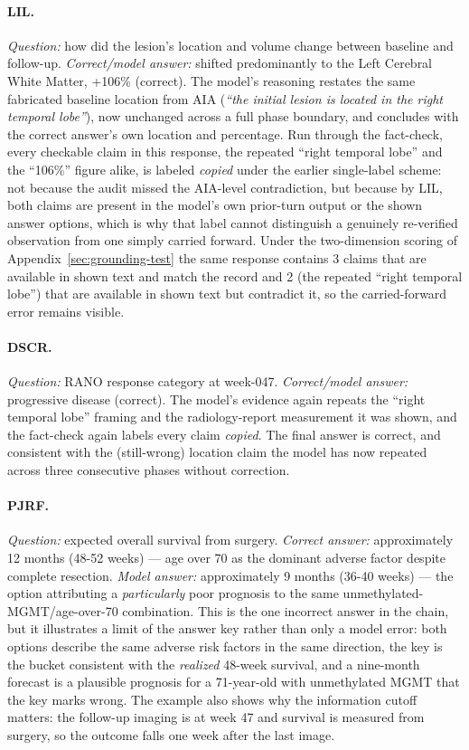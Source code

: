 \documentclass[11pt]{article}
\begin{document}
\paragraph{LIL.} \emph{Question:} how did the lesion's location and volume change between baseline and follow-up. \emph{Correct/model answer:} shifted predominantly to the Left Cerebral White Matter, +106\% (correct). The model's reasoning restates the same fabricated baseline location from AIA (\textit{``the initial lesion is located in the right temporal lobe''}), now unchanged across a full phase boundary, and concludes with the correct answer's own location and percentage. Run through the fact-check, every checkable claim in this response, the repeated ``right temporal lobe'' and the ``106\%'' figure alike, is labeled \emph{copied} under the earlier single-label scheme: not because the audit missed the AIA-level contradiction, but because by LIL, both claims are present in the model's own prior-turn output or the shown answer options, which is why that label cannot distinguish a genuinely re-verified observation from one simply carried forward. Under the two-dimension scoring of Appendix~\ref{sec:grounding-test} the same response contains 3 claims that are available in shown text and match the record and 2 (the repeated ``right temporal lobe'') that are available in shown text but contradict it, so the carried-forward error remains visible.

\paragraph{DSCR.} \emph{Question:} RANO response category at week-047. \emph{Correct/model answer:} progressive disease (correct). The model's evidence again repeats the ``right temporal lobe'' framing and the radiology-report measurement it was shown, and the fact-check again labels every claim \emph{copied}. The final answer is correct, and consistent with the (still-wrong) location claim the model has now repeated across three consecutive phases without correction.

\paragraph{PJRF.} \emph{Question:} expected overall survival from surgery. \emph{Correct answer:} approximately 12 months (48-52 weeks) — age over 70 as the dominant adverse factor despite complete resection. \emph{Model answer:} approximately 9 months (36-40 weeks) — the option attributing a \emph{particularly} poor prognosis to the same unmethylated-MGMT/age-over-70 combination. This is the one incorrect answer in the chain, but it illustrates a limit of the answer key rather than only a model error: both options describe the same adverse risk factors in the same direction, the key is the bucket consistent with the \emph{realized} 48-week survival, and a nine-month forecast is a plausible prognosis for a 71-year-old with unmethylated MGMT that the key marks wrong. The example also shows why the information cutoff matters: the follow-up imaging is at week 47 and survival is measured from surgery, so the outcome falls one week after the last image.
\end{document}
